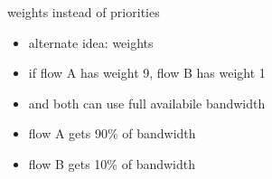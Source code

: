 \begin{frame}{weights instead of priorities}
    \begin{itemize}
    \item alternate idea: weights
    \item if flow A has weight 9, flow B has weight 1
    \item and both can use full availabile bandwidth
    \vspace{.5cm}
    \item flow A gets 90\% of bandwidth
    \item flow B gets 10\% of bandwidth
    \end{itemize}
\end{frame}
